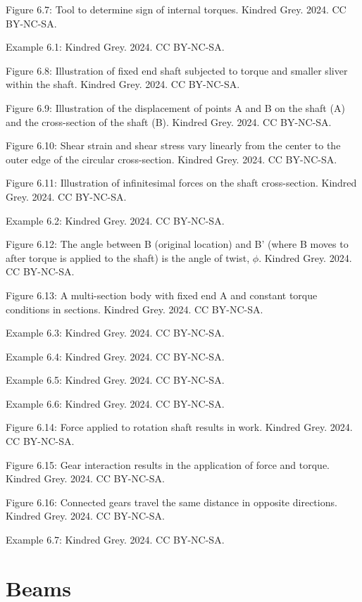 \documentclass[
  letterpaper,
  DIV=11,
  numbers=noendperiod]{scrreprt}
\theoremstyle{definition}
\theoremstyle{remark}
\begin{document}
Figure 6.7: Tool to determine sign of internal torques. Kindred Grey.
2024. CC BY-NC-SA.

Example 6.1: Kindred Grey. 2024. CC BY-NC-SA.

Figure 6.8: Illustration of fixed end shaft subjected to torque and
smaller sliver within the shaft. Kindred Grey. 2024. CC BY-NC-SA.

Figure 6.9: Illustration of the displacement of points A and B on the
shaft (A) and the cross-section of the shaft (B). Kindred Grey. 2024. CC
BY-NC-SA.

Figure 6.10: Shear strain and shear stress vary linearly from the center
to the outer edge of the circular cross-section. Kindred Grey. 2024. CC
BY-NC-SA.

Figure 6.11: Illustration of infinitesimal forces on the shaft
cross-section. Kindred Grey. 2024. CC BY-NC-SA.

Example 6.2: Kindred Grey. 2024. CC BY-NC-SA.

Figure 6.12: The angle between B (original location) and B' (where B
moves to after torque is applied to the shaft) is the angle of twist,
\(\phi\). Kindred Grey. 2024. CC BY-NC-SA.

Figure 6.13: A multi-section body with fixed end A and constant torque
conditions in sections. Kindred Grey. 2024. CC BY-NC-SA.

Example 6.3: Kindred Grey. 2024. CC BY-NC-SA.

Example 6.4: Kindred Grey. 2024. CC BY-NC-SA.

Example 6.5: Kindred Grey. 2024. CC BY-NC-SA.

Example 6.6: Kindred Grey. 2024. CC BY-NC-SA.

Figure 6.14: Force applied to rotation shaft results in work. Kindred
Grey. 2024. CC BY-NC-SA.

Figure 6.15: Gear interaction results in the application of force and
torque. Kindred Grey. 2024. CC BY-NC-SA.

Figure 6.16: Connected gears travel the same distance in opposite
directions. Kindred Grey. 2024. CC BY-NC-SA.

Example 6.7: Kindred Grey. 2024. CC BY-NC-SA.


\chapter{Beams}\label{sec-beams}
\end{document}
